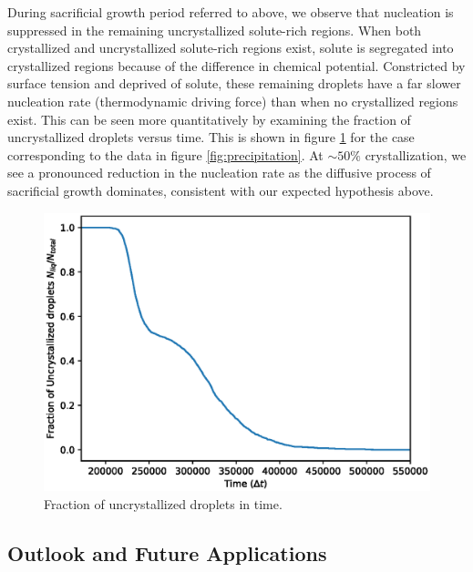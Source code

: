\documentclass[showkeys, prb, reprint]{revtex4-1}
\begin{document}

During sacrificial growth period referred to above, we observe that nucleation
is suppressed in the remaining uncrystallized solute-rich regions. When both
crystallized and uncrystallized solute-rich regions exist, solute is segregated
into crystallized regions because of the difference in chemical potential.
Constricted by surface tension and deprived of solute, these remaining droplets
have a far slower nucleation rate (thermodynamic driving force) than when no
crystallized regions exist. This can be seen more quantitatively by examining
the fraction of uncrystallized droplets versus time. This is shown in figure
\ref{fig:incubation} for the case corresponding to the data in figure
\ref{fig:precipitation}. At $\sim 50\%$ crystallization, we see a pronounced
reduction in the nucleation rate as the diffusive process of sacrificial growth
dominates, consistent with our expected hypothesis above.
%
\begin{figure}
    \centering
    \includegraphics[width=\columnwidth]{incubation}
    \caption[Fraction of uncrystallized droplets in time]{
        \label{fig:incubation}
        Fraction of uncrystallized droplets in time.
    }
\end{figure}

\subsection{Outlook and Future Applications} %
\end{document}
